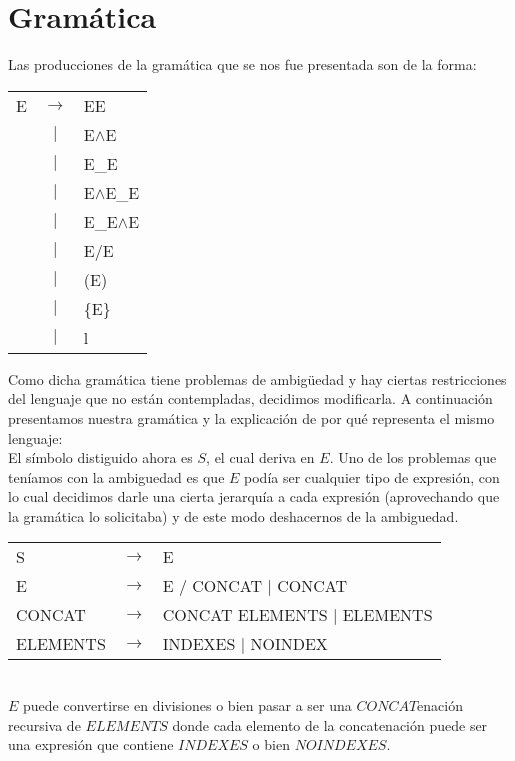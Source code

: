\section{Gramática}
Las producciones de la gram\'atica que se nos fue presentada son de la forma:\\

\begin{tabular}{ l c l }
    E & $\rightarrow$ & EE \\
    & $|$ & E$\wedge$E \\
    & $|$ & E\_E \\
    & $|$ & E$\wedge$E\_E \\
    & $|$ & E\_E$\wedge$E \\
    & $|$ & E$\slash$E \\
    & $|$ & (E) \\
    & $|$ & \{E\} \\
    & $|$ & l \\
\end{tabular}

Como dicha gram\'atica tiene problemas de ambig\"uedad y hay ciertas restricciones del lenguaje que no est\'an contempladas, decidimos modificarla.
A continuaci\'on presentamos nuestra gram\'atica y la explicaci\'on de por qu\'e representa el mismo lenguaje: \\

El s\'imbolo distiguido ahora es $S$, el cual deriva en $E$. Uno de los problemas que ten\'iamos con la ambiguedad es que $E$ pod\'ia ser cualquier tipo de expresi\'on, con lo cual decidimos darle una cierta jerarqu\'ia a cada expresi\'on (aprovechando que la gram\'atica lo solicitaba) y de este modo deshacernos de la ambiguedad.\\


\begin{tabular}{ l c l }
    S &        $\rightarrow$ & E \\
    E &        $\rightarrow$ & E $\slash$ CONCAT $|$ CONCAT \\
    CONCAT &   $\rightarrow$ & CONCAT ELEMENTS $|$ ELEMENTS \\
    ELEMENTS & $\rightarrow$ & INDEXES $|$ NOINDEX \\
\end{tabular} \\
$E$ puede convertirse en divisiones o bien pasar a ser una $CONCAT$enaci\'on recursiva de $ELEMENTS$ donde cada elemento de la concatenaci\'on
puede ser una expresi\'on que contiene $INDEXES$ o bien $NOINDEXES$.\\

